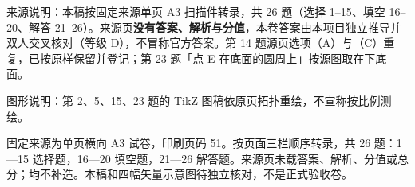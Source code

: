 

\begin{gktip}
来源说明：本稿按固定来源单页 A3 扫描件转录，共 26 题（选择 1–15、填空 16–20、解答 21–26）。来源页\textbf{没有答案、解析与分值}，本卷答案由本项目独立推导并双人交叉核对（等级 D），不冒称官方答案。第 14 题源页选项（A）与（C）重复，已按原样保留并登记；第 23 题「点 E 在底面的圆周上」按源图取在下底面。

图形说明：第 2、5、15、23 题的 TikZ 图稿依原页拓扑重绘，不宣称按比例测绘。
\end{gktip}

\begin{gktip}
固定来源为单页横向 A3 试卷，印刷页码 51。按页面三栏顺序转录，共 26 题：1—15 选择题，16—20 填空题，21—26 解答题。来源页未载答案、解析、分值或总分；均不补造。本稿和四幅矢量示意图待独立核对，不是正式验收卷。
\end{gktip}

